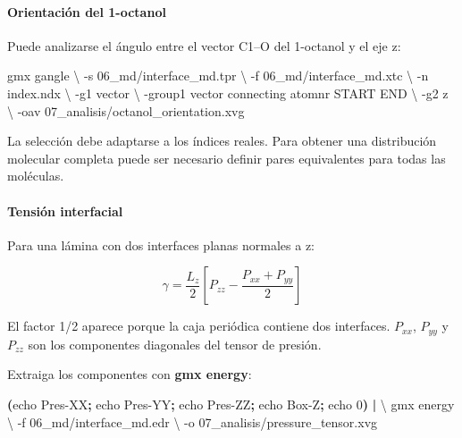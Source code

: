 \documentclass[
  spanish,
  11pt,
  a4paper]{article}
\newenvironment{Shaded}{\begin{snugshade}}{\end{snugshade}}
\newcommand{\AttributeTok}[1]{\textcolor[rgb]{0.13,0.29,0.53}{#1}}
\newcommand{\BuiltInTok}[1]{#1}
\newcommand{\DataTypeTok}[1]{\textcolor[rgb]{0.13,0.29,0.53}{#1}}
\newcommand{\ExtensionTok}[1]{#1}
\newcommand{\KeywordTok}[1]{\textcolor[rgb]{0.13,0.29,0.53}{\textbf{#1}}}
\newcommand{\NormalTok}[1]{#1}
\newcommand{\StringTok}[1]{\textcolor[rgb]{0.31,0.60,0.02}{#1}}
\begin{document}
\paragraph{Orientación del
1-octanol}\label{orientaciuxf3n-del-1-octanol}

Puede analizarse el ángulo entre el vector C1--O del 1-octanol y el eje
z:

\begin{Shaded}
\begin{Highlighting}[]
\ExtensionTok{gmx}\NormalTok{ gangle }\DataTypeTok{\textbackslash{}}
    \AttributeTok{{-}s}\NormalTok{ 06\_md/interface\_md.tpr }\DataTypeTok{\textbackslash{}}
    \AttributeTok{{-}f}\NormalTok{ 06\_md/interface\_md.xtc }\DataTypeTok{\textbackslash{}}
    \AttributeTok{{-}n}\NormalTok{ index.ndx }\DataTypeTok{\textbackslash{}}
    \AttributeTok{{-}g1}\NormalTok{ vector }\DataTypeTok{\textbackslash{}}
    \AttributeTok{{-}group1} \StringTok{\textquotesingle{}vector connecting atomnr START END\textquotesingle{}} \DataTypeTok{\textbackslash{}}
    \AttributeTok{{-}g2}\NormalTok{ z }\DataTypeTok{\textbackslash{}}
    \AttributeTok{{-}oav}\NormalTok{ 07\_analisis/octanol\_orientation.xvg}
\end{Highlighting}
\end{Shaded}

La selección debe adaptarse a los índices reales. Para obtener una
distribución molecular completa puede ser necesario definir pares
equivalentes para todas las moléculas.

\paragraph{Tensión interfacial}\label{tensiuxf3n-interfacial}

Para una lámina con dos interfaces planas normales a z:

\[
\gamma =
\frac{L_z}{2}
\left[
P_{zz}-
\frac{P_{xx}+P_{yy}}{2}
\right]
\]

El factor 1/2 aparece porque la caja periódica contiene dos interfaces.
\(P_{xx}\), \(P_{yy}\) y \(P_{zz}\) son los componentes diagonales del
tensor de presión.

Extraiga los componentes con \textbf{gmx energy}:

\begin{Shaded}
\begin{Highlighting}[]
\KeywordTok{(}\BuiltInTok{echo}\NormalTok{ Pres{-}XX}\KeywordTok{;} \BuiltInTok{echo}\NormalTok{ Pres{-}YY}\KeywordTok{;} \BuiltInTok{echo}\NormalTok{ Pres{-}ZZ}\KeywordTok{;} \BuiltInTok{echo}\NormalTok{ Box{-}Z}\KeywordTok{;} \BuiltInTok{echo}\NormalTok{ 0}\KeywordTok{)} \KeywordTok{|} \DataTypeTok{\textbackslash{}}
\ExtensionTok{gmx}\NormalTok{ energy }\DataTypeTok{\textbackslash{}}
    \AttributeTok{{-}f}\NormalTok{ 06\_md/interface\_md.edr }\DataTypeTok{\textbackslash{}}
    \AttributeTok{{-}o}\NormalTok{ 07\_analisis/pressure\_tensor.xvg}
\end{Highlighting}
\end{Shaded}
\end{document}
